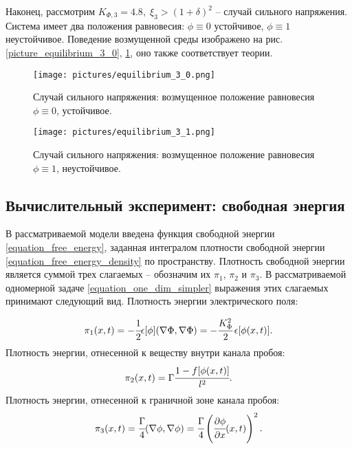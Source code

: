\documentclass[a4paper,12pt]{article}
\theoremstyle{plain}
\theoremstyle{definition}
\begin{document}
Наконец, рассмотрим $K_{\Phi, 3} = 4.8, \; \xi_3 > (1 + \delta)^2$ -- случай сильного напряжения. Система имеет два положения равновесия: $\phi \equiv 0$ устойчивое, $\phi \equiv 1$ неустойчивое. Поведение возмущенной среды изображено на рис. \ref{picture_equilibrium_3_0}, \ref{picture_equilibrium_3_1}, оно также соответствует теории.

\begin{figure}[!t]
    \centering
    \texttt{[image: pictures/equilibrium\_3\_0.png]}
    \vspace{-0.8cm}
    \caption{Случай сильного напряжения: возмущенное положение равновесия $\phi \equiv 0$, \linebreak устойчивое.}
    \label{picture_equilibrium_3_0}
    \vspace{0.5cm}
    
    \texttt{[image: pictures/equilibrium\_3\_1.png]}
    \vspace{-0.8cm}
    \caption{Случай сильного напряжения: возмущенное положение равновесия $\phi \equiv 1$, \linebreak неустойчивое.}
    \label{picture_equilibrium_3_1}
\end{figure}


\subsection{Вычислительный эксперимент: свободная энергия}

В рассматриваемой модели введена функция свободной энергии \eqref{equation_free_energy}, заданная интегралом плотности свободной энергии \eqref{equation_free_energy_density} по пространству. Плотность свободной энергии является суммой трех слагаемых -- обозначим их $\pi_1$, $\pi_2$ и $\pi_3$. В рассматриваемой одномерной задаче \eqref{equation_one_dim_simpler} выражения этих слагаемых принимают следующий вид. Плотность энергии электрического поля:

\begin{equation}
    \pi_1(x, t) = -\cfrac{1}{2} \epsilon[\phi] (\nabla \Phi, \nabla \Phi) = -\cfrac{K_\Phi^2}{2} \, \epsilon[\phi(x, t)] \text{.}
    \label{equation_free_energy_density_electrical}
\end{equation}
Плотность энергии, отнесенной к веществу внутри канала пробоя:
\begin{equation}
    \pi_2(x, t) = \Gamma \cfrac{1 - f[\phi(x, t)]}{l^2} \text{.}
    \label{equation_free_energy_density_inner}
\end{equation}
Плотность энергии, отнесенной к граничной зоне канала пробоя:
\begin{equation}
    \pi_3(x, t) = \cfrac{\Gamma}{4} (\nabla \phi, \nabla \phi) = \cfrac{\Gamma}{4} \left( \cfrac{\partial \phi}{\partial x}(x, t) \right)^2 \text{.}
    \label{equation_free_energy_density_border}
\end{equation}
\end{document}

